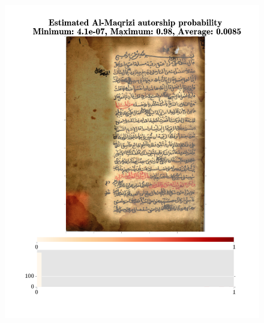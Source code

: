 \documentclass[conference,a4paper,twocolumn]{IEEEtran}
\begin{document}
\begin{figure}
\centering
\begin{minipage}{.48\linewidth}
	\centering
  \includegraphics[width=\linewidth]{figures/not_al_maqrizi_image_classification_example.png}
\end{minipage}
\hspace{.01\linewidth}
\begin{minipage}{.48\linewidth}
	\centering

\end{minipage}
\end{figure}
\end{document}
